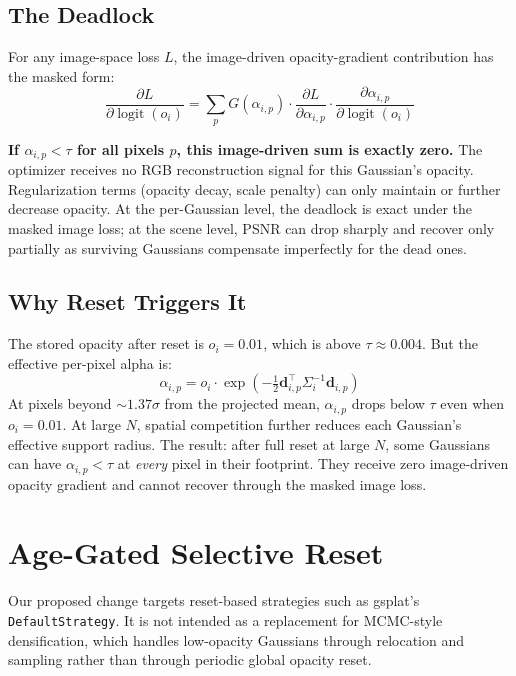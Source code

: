\documentclass[runningheads]{llncs}
\newcommand{\DefaultStrategy}{\texttt{Default\allowbreak Strategy}}
\begin{document}
\subsection{The Deadlock}

For any image-space loss $L$, the image-driven opacity-gradient contribution has the masked form:
\begin{equation}
\frac{\partial L}{\partial \operatorname{logit}(o_i)} = \sum_p G(\alpha_{i,p}) \cdot \frac{\partial L}{\partial \alpha_{i,p}} \cdot \frac{\partial \alpha_{i,p}}{\partial \operatorname{logit}(o_i)}
\end{equation}

\textbf{If $\alpha_{i,p} < \tau$ for all pixels $p$, this image-driven sum is exactly zero.} The optimizer receives no RGB reconstruction signal for this Gaussian's opacity. Regularization terms (opacity decay, scale penalty) can only maintain or further decrease opacity. At the per-Gaussian level, the deadlock is exact under the masked image loss; at the scene level, PSNR can drop sharply and recover only partially as surviving Gaussians compensate imperfectly for the dead ones.

\subsection{Why Reset Triggers It}

The stored opacity after reset is $o_i = 0.01$, which is above $\tau \approx 0.004$. But the effective per-pixel alpha is:
\begin{equation}
\alpha_{i,p} = o_i \cdot \exp\!\left(-\tfrac{1}{2}\mathbf{d}_{i,p}^\top \Sigma_i^{-1} \mathbf{d}_{i,p}\right)
\end{equation}
At pixels beyond ${\sim}1.37\sigma$ from the projected mean, $\alpha_{i,p}$ drops below $\tau$ even when $o_i = 0.01$. At large $N$, spatial competition further reduces each Gaussian's effective support radius. The result: after full reset at large $N$, some Gaussians can have $\alpha_{i,p} < \tau$ at \emph{every} pixel in their footprint. They receive zero image-driven opacity gradient and cannot recover through the masked image loss.

\section{Age-Gated Selective Reset}

Our proposed change targets reset-based strategies such as gsplat's \DefaultStrategy{}. It is not intended as a replacement for MCMC-style densification, which handles low-opacity Gaussians through relocation and sampling rather than through periodic global opacity reset.
\end{document}

